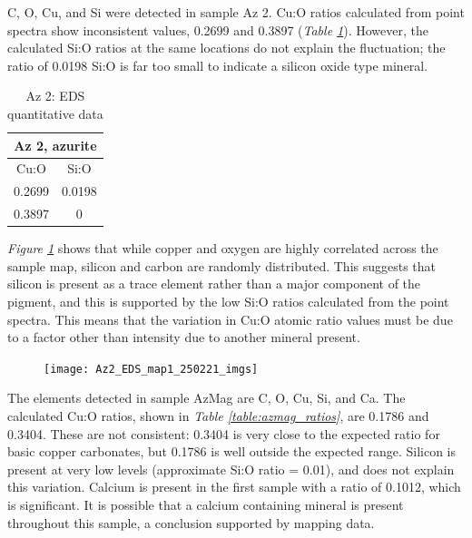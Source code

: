
C, O, Cu, and Si were detected in sample Az 2. Cu:O ratios calculated from point spectra show inconsistent values, 0.2699 and 0.3897 (\textit{Table \ref{table:az2_ratios}}). However, the calculated Si:O ratios at the same locations do not explain the fluctuation; the ratio of 0.0198 Si:O is far too small to indicate a silicon oxide type mineral.

\begin{table}[H]
\caption{Az 2: EDS quantitative data}
\centering
\label{table:az2_ratios}
\begin{tabular}{c c}
\toprule
\multicolumn{2}{c}{Az 2, azurite} \\
\midrule
Cu:O & Si:O \\
\midrule
0.2699 & 0.0198 \\
0.3897 & 0 \\
\bottomrule
\end{tabular}
\end{table}

\textit{Figure \ref{fig:az2_map1}} shows that while copper and oxygen are highly correlated across the sample map, silicon and carbon are randomly distributed. This suggests that silicon is present as a trace element rather than a major component of the pigment, and this is supported by the low Si:O ratios calculated from the point spectra. This means that the variation in Cu:O atomic ratio values must be due to a factor other than intensity due to another mineral present.

\begin{figure}[H]
\centering
  \texttt{[image: Az2\_EDS\_map1\_250221\_imgs]}
\label{fig:az2_map1}
\end{figure}


The elements detected in sample AzMag are C, O, Cu, Si, and Ca. The calculated Cu:O ratios, shown in \textit{Table \ref{table:azmag_ratios}}, are 0.1786 and 0.3404. These are not consistent: 0.3404 is very close to the expected ratio for basic copper carbonates, but 0.1786 is well outside the expected range. Silicon is present at very low levels (approximate Si:O ratio = 0.01), and does not explain this variation. Calcium is present in the first sample with a ratio of 0.1012, which is significant. It is possible that a calcium containing mineral is present throughout this sample, a conclusion supported by mapping data.

